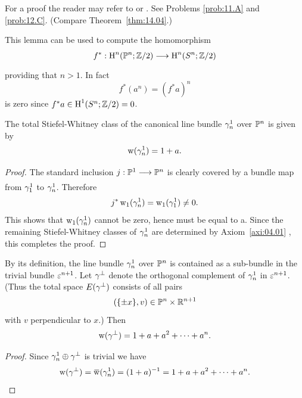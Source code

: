 \documentclass[../main]{subfiles}
\begin{document}
For a proof the reader may refer to \cite[$\S$ 4.3.3]{hiltonwylie1960} or \cite[p. 264]{spanier1981}. See Problems \ref{prob:11.A} and \ref{prob:12.C}. (Compare Theorem~\ref{thm:14.04}.)

\begin{remark}
\label{rem:04.02}
This lemma can be used to compute the homomorphism
\[
f^*: \homology^n(\projective^{n}; \mathbb{Z} / 2) \varrightarrow{} \homology^n(S^n ; \mathbb{Z} / 2)
\]
providing that $n>1$. In fact
\[
f^*(a^n)=(f^* a)^n
\]
is zero since $f^* a \in \operatorname{H}^1(S^n ; \mathbb{Z} / 2)=0$.
\end{remark}

\begin{example}
\label{exa:04.02}
The total Stiefel-Whitney class of the canonical line bundle $\gamma_{n}^{1}$ over $\mathbb{P}^{n}$ is given by
\[
\operatorname{w}(\gamma_{n}^{1})=1+a .
\]
\end{example}

\begin{proof}
The standard inclusion $j: \projective^1 \varrightarrow{} \projective^n$ is clearly covered by a bundle map from $\gamma_1^1$ to $\gamma_{n}^1$. Therefore
\[
j^* \operatorname{w}_1(\gamma_n^1)=\operatorname{w}_1(\gamma_1^1) \neq 0 .
\]
This shows that $\operatorname{w}_1(\gamma_n^1)$ cannot be zero, hence must be equal to a. Since the remaining Stiefel-Whitney classes of $\gamma_n^1$ are determined by Axiom~\ref{axi:04.01} , this completes the proof.
\end{proof}

\begin{example}
\label{exa:04.03}
By its definition, the line bundle $\gamma_n^1$ over $\mathbb{P}^n$ is contained as a \mbox{sub-bundle} in the trivial bundle $\varepsilon^{n+1}$. Let $\gamma^{\perp}$ denote the orthogonal \mbox{complement} of $\gamma_{n}^{1}$ in $\varepsilon^{n+1}$. (Thus the total space $E(\gamma^{\perp})$ consists of all pairs
\[
(\{\pm x\}, v) \in \mathbb{P}^{n} \times \mathbb{R}^{n+1}
\]
with $v$ perpendicular to $x$.) Then
\[
\operatorname{w}(\gamma^{\perp})=1+a+a^2+\cdots+a^n .
\]
\end{example}

\begin{proof}
Since $\gamma_{n}^{1} \oplus \gamma^{\perp}$ is trivial we have
\[
\sw(\tautological^{\perp})=\xoverline{\sw}(\tautological_n^1)=(1+a)^{-1}=1+a+a^2+\cdots+a^n .
\]
\end{proof}
\end{document}

